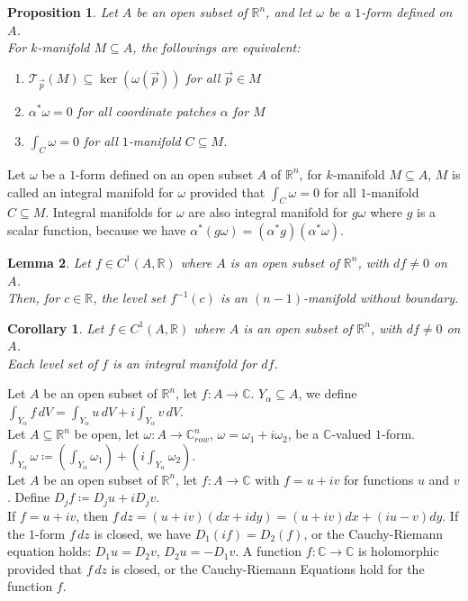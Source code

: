 \documentclass[9pt]{article}
\theoremstyle{break}
\theoremstyle{break}
\newtheorem{lem}{Lemma}[thm]
\newtheorem{prop}[lem]{Proposition}
\newtheorem{corL}{Corollary}[lem]
\newcommand{\R}{\mathbb{R}}
\newcommand{\T}{\mathcal{T}}
\newcommand{\Complex}{\mathbb{C}}
\begin{document}
\begin{prop}
Let $A$ be an open subset of $\R^n$, and let $\omega$ be a $1$-form defined on $A$. \\
For $k$-manifold $M\subseteq A$, the followings are equivalent:
\begin{enumerate}[topsep=3pt,itemsep=-1ex,partopsep=1ex,parsep=1ex]
\item $\T_{\vec{p}}(M) \subseteq \ker(\omega(\vec{p}))$ for all $\vec{p}\in M$
\item $\alpha^*\omega = 0$ for all coordinate patches $\alpha$ for $M$
\item $\int_C \omega =0$ for all $1$-manifold $C\subseteq M$. 
\end{enumerate} 
\end{prop}

Let $\omega$ be a $1$-form defined on an open subset $A$ of $\R^n$, for $k$-manifold $M \subseteq A$, $M$ is called an integral manifold for $\omega$ provided that $\int_C \omega =0$ for all $1$-manifold $C\subseteq M$. Integral manifolds for $\omega$ are also integral manifold for $g\omega$ where $g$ is a scalar function, because we have $\alpha^*(g\omega) = (\alpha^*g)(\alpha^*\omega)$.

\begin{lem}
Let $f \in C^1(A,\R)$ where $A$ is an open subset of $\R^n$, with $df \neq 0$ on $A$. \\Then, for $c \in \R$, the level set $f^{-1}(c)$ is an $(n-1)$-manifold without boundary.
\end{lem}

\begin{corL}
Let $f \in C^1(A,\R)$ where $A$ is an open subset of $\R^n$, with $df \neq 0$ on $A$.\\
Each level set of $f$ is an integral manifold for $df$.
\end{corL}

Let $A$ be an open subset of $\R^n$, let $f:A \to \Complex$. $Y_\alpha \subseteq A$, we define $\int_{Y_\alpha} f\, dV = \int_{Y_\alpha}u \, dV + i \int_{Y_\alpha} v \, dV$.\\
Let $A\subseteq \R^n$ be open, let $\omega:A \to \Complex^n_{row}$, $\omega = \omega_1 + i \omega_2$, be a $\Complex$-valued $1$-form. $\int_{Y_\alpha} \omega \coloneqq (\int_{Y_\alpha} \omega_1 )+( i\int_{Y_\alpha} \omega_2)$.\\
Let $A$ be an open subset of $\R^n$, let $f:A \to \Complex$ with $f = u+iv$ for functions $u$ and $v$. Define $D_j f \coloneqq D_j u + i D_j v$.\\
If $f = u + iv$, then $f\, dz = (u+iv)(dx+idy) = (u+iv)dx+(iu-v) dy$. If the $1$-form $f\, dz$ is closed, we have $D_1(if) = D_2(f)$, or the Cauchy-Riemann equation holds: $D_1 u = D_2 v$, $D_2 u = -D_1 v$.
A function $f:\Complex \to \Complex$ is holomorphic provided that $f\, dz$ is closed, or the Cauchy-Riemann Equations hold for the function $f$. 
\end{document}
